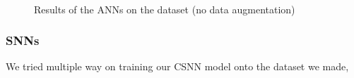 \documentclass[11pt]{article}
\begin{document}
\begin{figure}[H]
{    \label{fig:conf_mat_resnet}}
  \\
  \hfill
  \hfill
  \label{fig:conf_mat_mobileV2}
  \caption{Results of the ANNs on the dataset (no data augmentation)}
  \label{fig:results_anns}
\end{figure}


\subsubsection*{SNNs}

We tried multiple way on training our CSNN model onto the dataset we made,



\pagebreak



\end{document}
